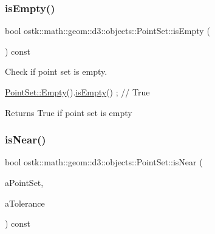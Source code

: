 \mbox{\label{classostk_1_1math_1_1geom_1_1d3_1_1objects_1_1_point_set_a107e4bdbcee1586d393d804428889049}} 
\subsubsection{\texorpdfstring{is\+Empty()}{isEmpty()}}
{\footnotesize\ttfamily bool ostk\+::math\+::geom\+::d3\+::objects\+::\+Point\+Set\+::is\+Empty (\begin{DoxyParamCaption}{ }\end{DoxyParamCaption}) const}



Check if point set is empty. 


\begin{DoxyCode}
\hyperlink{classostk_1_1math_1_1geom_1_1d3_1_1objects_1_1_point_set_a1b14ed7d73ee7ac5e2796cf44f06ffe9}{PointSet::Empty}().\hyperlink{classostk_1_1math_1_1geom_1_1d3_1_1objects_1_1_point_set_a107e4bdbcee1586d393d804428889049}{isEmpty}() ; \textcolor{comment}{// True}
\end{DoxyCode}


\begin{DoxyReturn}{Returns}
True if point set is empty 
\end{DoxyReturn}
\mbox{\label{classostk_1_1math_1_1geom_1_1d3_1_1objects_1_1_point_set_a5ee3cc0360a12ff12dc960f6a09aacc2}} 
\subsubsection{\texorpdfstring{is\+Near()}{isNear()}}
{\footnotesize\ttfamily bool ostk\+::math\+::geom\+::d3\+::objects\+::\+Point\+Set\+::is\+Near (\begin{DoxyParamCaption}\item[{const \hyperlink{classostk_1_1math_1_1geom_1_1d3_1_1objects_1_1_point_set}{Point\+Set} \&}]{a\+Point\+Set,  }\item[{const Real \&}]{a\+Tolerance }\end{DoxyParamCaption}) const}



